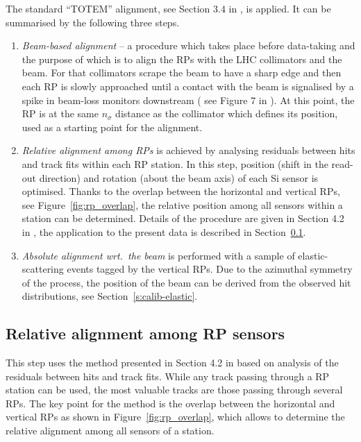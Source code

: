 \documentclass[TOTEM]{cern/cernphprep}
\begin{document}
The standard ``TOTEM'' alignment, see Section 3.4 in \cite{totem-ijmp}, is applied. It can be summarised by the following three steps.
\begin{enumerate}[noitemsep]
\item {\em Beam-based alignment} -- a procedure which takes place before data-taking and the purpose of which is to align the RPs with the LHC collimators and the beam. For that collimators scrape the beam to have a sharp edge and then each RP is slowly approached until a contact with the beam is signalised by a spike in beam-loss monitors downstream ( see Figure 7 in \cite{totem-ijmp}). At this point, the RP is at the same $n_\sigma$ distance as the collimator which defines its position, used as a starting point for the alignment.
\item {\em Relative alignment among RPs} is achieved by analysing residuals between hits and track fits within each RP station. In this step, position (shift in the read-out direction) and rotation (about the beam axis) of each Si sensor is optimised. Thanks to the overlap between the horizontal and vertical RPs, see Figure~\ref{fig:rp_overlap}, the relative position among all sensors within a station can be determined. Details of the procedure are given in Section 4.2 in \cite{jan_thesis}, the application to the present data is described in Section~\ref{s:calib-track}.
\item {\em Absolute alignment wrt.~the beam} is performed with a sample of elastic-scattering events tagged by the vertical RPs. Due to the azimuthal symmetry of the process, the position of the beam can be derived from the observed hit distributions, see Section~\ref{s:calib-elastic}.
\end{enumerate}

\subsection{Relative alignment among RP sensors}
\label{s:calib-track}

This step uses the method presented in Section 4.2 in \cite{jan_thesis} based on analysis of the residuals between hits and track fits. While any track passing through a RP station can be used, the most valuable tracks are those passing through several RPs. The key point for the method is the overlap between the horizontal and vertical RPs as shown in Figure~\ref{fig:rp_overlap}, which allows to determine the relative alignment among all sensors of a station.
\end{document}
